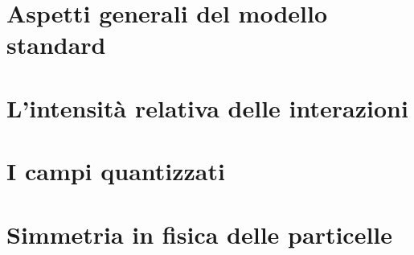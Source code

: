 \section{Aspetti generali del modello standard}\label{sec:aspetti-generali-del-modello-standard}

\section{L'intensità relativa delle interazioni}\label{sec:intensita-relativa-delle-interazioni}

\section{I campi quantizzati}\label{sec:campi-quantizzati}

\section{Simmetria in fisica delle particelle}\label{sec:simmetria-in-fisica-delle-particelle}

